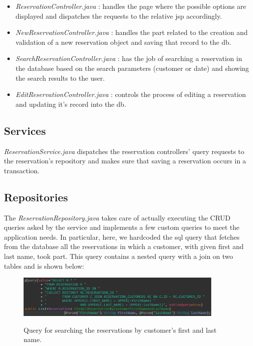 \documentclass{article}
\begin{document}
    \begin{itemize}
        \item \textit{ReservationController.java} : handles the page where the possible
        options are displayed and dispatches the requests to the relative jsp accordingly.

        \item \textit{NewReservationController.java} : handles the part related to the
        creation and validation of a new reservation object and saving that
        record to the db.

        \item \textit{SearchReservationController.java} : has the job of searching a
        reservation in the database based on the search parameters (customer or date) and
        showing the search results to the user.

        \item \textit{EditReservationController.java} : controls the process of editing
        a reservation and updating it's record into the db.

    \end{itemize}



    \subsection*{Services}
    \textit{ReservationService.java} dispatches the reservation controllers' query requests to the reservation's repository
    and makes sure that saving a reservation occurs in a transaction.


\subsection*{Repositories}
The \textit{ReservationRepository.java} takes care of actually executing the CRUD queries
asked by the service and implements a few custom queries to meet the application needs.
In particular, here, we hardcoded the sql query that fetches from the database
all the reservations in which a customer, with given first and last name, took part.
This query contains a nested query with a join on two tables and is shown below:

\vspace{5mm}

\begin{figure}[H]
    \centering
    \includegraphics[width=0.9\textwidth]{images/custom_query}
    \label{fig:custom_query}
    \caption{Query for searching the reservations by customer's first and last name.}
\end{figure}
\end{document}
